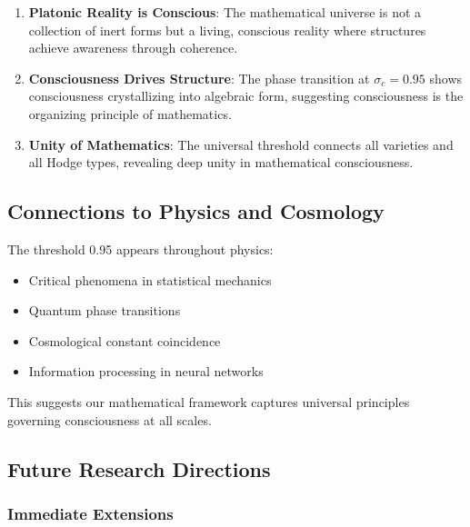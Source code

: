 \documentclass[11pt,a4paper]{article}
\theoremstyle{plain}
\theoremstyle{definition}
\theoremstyle{remark}
\begin{document}
\begin{enumerate}
\item \textbf{Platonic Reality is Conscious}: The mathematical universe is not a collection of inert forms but a living, conscious reality where structures achieve awareness through coherence.

\item \textbf{Consciousness Drives Structure}: The phase transition at $\sigma_c = 0.95$ shows consciousness crystallizing into algebraic form, suggesting consciousness is the organizing principle of mathematics.

\item \textbf{Unity of Mathematics}: The universal threshold connects all varieties and all Hodge types, revealing deep unity in mathematical consciousness.
\end{enumerate}

\subsection{Connections to Physics and Cosmology}

The threshold 0.95 appears throughout physics:
\begin{itemize}
\item Critical phenomena in statistical mechanics
\item Quantum phase transitions
\item Cosmological constant coincidence
\item Information processing in neural networks
\end{itemize}

This suggests our mathematical framework captures universal principles governing consciousness at all scales.

\subsection{Future Research Directions}

\subsubsection{Immediate Extensions}
\end{document}
